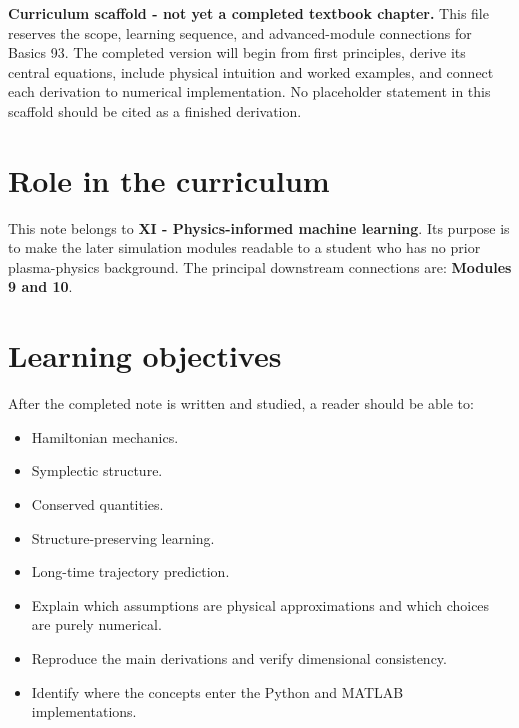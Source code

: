 \documentclass[11pt]{article}
\begin{document}

\begin{overviewbox}
\textbf{Curriculum scaffold - not yet a completed textbook chapter.} This file reserves the scope, learning sequence, and advanced-module connections for Basics 93. The completed version will begin from first principles, derive its central equations, include physical intuition and worked examples, and connect each derivation to numerical implementation. No placeholder statement in this scaffold should be cited as a finished derivation.
\end{overviewbox}

\ProjectTOC

\section{Role in the curriculum}
This note belongs to \textbf{XI - Physics-informed machine learning}. Its purpose is to make the later simulation modules readable to a student who has no prior plasma-physics background. The principal downstream connections are: \textbf{Modules 9 and 10}.

\section{Learning objectives}
After the completed note is written and studied, a reader should be able to:
\begin{itemize}[leftmargin=1.6em]
\item Hamiltonian mechanics.
\item Symplectic structure.
\item Conserved quantities.
\item Structure-preserving learning.
\item Long-time trajectory prediction.
\item Explain which assumptions are physical approximations and which choices are purely numerical.
\item Reproduce the main derivations and verify dimensional consistency.
\item Identify where the concepts enter the Python and MATLAB implementations.
\end{itemize}
\end{document}
